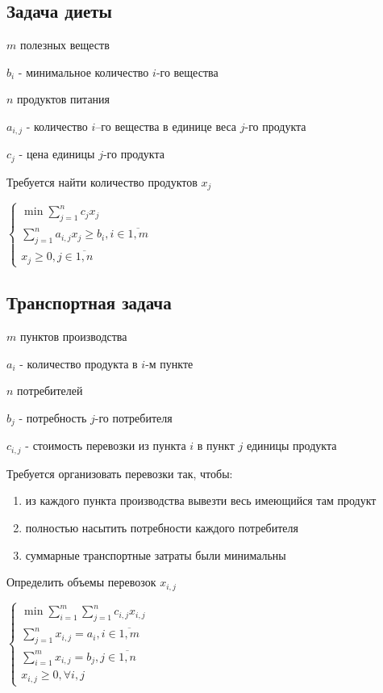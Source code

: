 \documentclass[11pt]{article}
\theoremstyle{break}
\begin{document}
\begin{sloppypar}
  \subsection*{Задача диеты}
  $m$ полезных веществ
  
  $b_i$ - минимальное количество $i$-го вещества
  
  $n$ продуктов питания

  $a_{i, j}$ - количество $i$–го вещества в единице веса $j$-го продукта

  $c_j$ - цена единицы $j$-го продукта

  Требуется найти количество продуктов $x_j$
  
  $\begin{cases}
    \min \sum_{j = 1}^n c_j x_j \\
    \sum_{j = 1}^n a_{i, j} x_j \geq b_i, i \in \overline{1, m} \\
    x_j \geq 0, j \in \overline{1, n}
  \end{cases}$
  
  \subsection*{Транспортная задача}
  $m$ пунктов производства
  
  $a_i$ - количество продукта в $i$-м пункте 

  $n$ потребителей

  $b_j$ - потребность $j$-го потребителя
  
  $c_{i, j}$ - стоимость перевозки из пункта $i$ в пункт $j$ единицы продукта
  
  Требуется организовать перевозки так, чтобы:
  \begin{enumerate}
    \item из каждого пункта производства вывезти весь имеющийся там продукт 
    \item полностью насытить потребности каждого потребителя
    \item суммарные транспортные затраты были минимальны
  \end{enumerate}
  
  Определить объемы перевозок $x_{i, j}$
  
  $\begin{cases}
    \min \sum_{i = 1}^m \sum_{j = 1}^n c_{i, j} x_{i, j} \\
    \sum_{j = 1}^n x_{i, j} = a_i, i \in \overline{1, m} \\
    \sum_{i = 1}^m x_{i, j} = b_j, j \in \overline{1, n} \\
    x_{i, j} \geq 0, \forall i, j
  \end{cases}$
  

\end{sloppypar}
\end{document}
